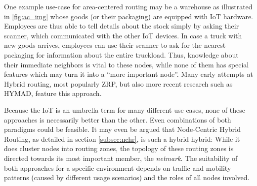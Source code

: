 \documentclass[a4paper,10pt]{scrartcl}
\begin{document}
\begin{description}
One example use-case for area-centered routing may be a warehouse as illustrated in \ref{fig:ac_img} whose goods (or their packaging) are equipped with IoT hardware. Employees are thus able to tell details about the stock simply by asking their scanner, which communicated with the other IoT devices. In case a truck with new goods arrives, employees can use their scanner to ask for the nearest packaging for information about the entire truckload. Thus, knowledge about their immediate neighbors is vital to these nodes, while none of them has special features which may turn it into a ``more important node''. Many early attempts at Hybrid routing, most popularly \gls{ZRP}, but also more recent research such as HYMAD, feature this approach.
\end{description}

Because the IoT is an umbrella term for many different use cases, none of these approaches is necessarily better than the other. Even combinations of both paradigms could be feasible. It may even be argued that Node-Centric Hybrid Routing, as detailed in section \ref{subsec:nchr}, is such a hybrid-hybrid: While it does cluster nodes into routing zones, the topology of these routing zones is directed towards its most important member, the \emph{netmark}. The suitability of both approaches for a specific environment depends on traffic and mobility patterns (caused by different usage scenarios) and the roles of all nodes involved.
\end{document}
